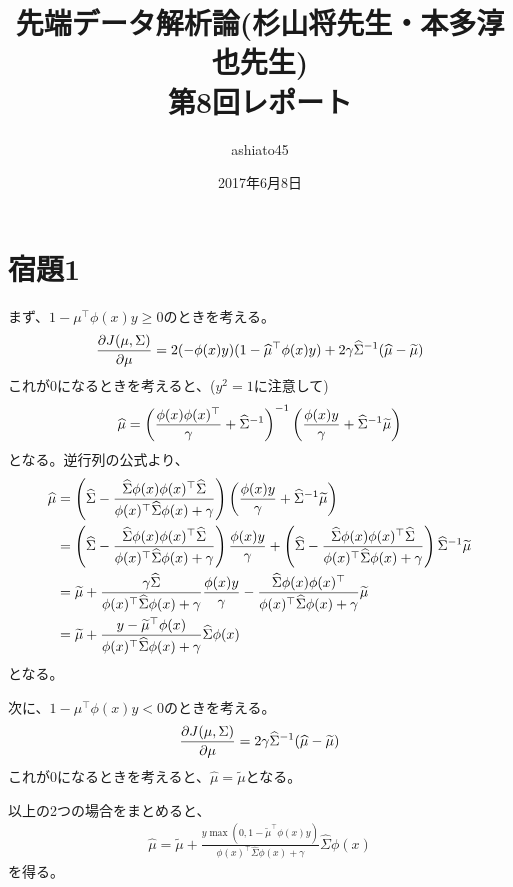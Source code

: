 \documentclass[9pt]{ltjsarticle}
\title{先端データ解析論(杉山将先生・本多淳也先生)\\第8回レポート}
\author{ashiato45}
\date{2017年6月8日}
\begin{document}
\maketitle

\section*{宿題1}
まず、$1-\mu^\top \phi(x)y \ge 0$のときを考える。
\begin{align}
\frac{\partial J(\mu, \Sigma)}{\partial \mu} = 
2(-\phi(x)y)(1-\widehat{\mu}^\top \phi(x)y) + 2\gamma \widehat\Sigma^{-1} (\widehat \mu - \widetilde \mu)
\end{align}
これが0になるときを考えると、($y^2=1$に注意して)
\begin{align}
\widehat \mu = \left(\frac{\phi(x)\phi(x)^\top}{\gamma} + \widehat \Sigma^{-1}\right)^{-1}\left(\frac{\phi(x)y}{\gamma} + \widehat\Sigma^{-1} \widetilde \mu\right)
\end{align}
となる。逆行列の公式より、
\begin{align}
\widehat \mu &= 
\left(\widehat\Sigma - \frac{\widehat\Sigma\phi(x)\phi(x)^\top \widehat\Sigma}{\phi(x)^\top \widehat\Sigma\phi(x)+\gamma}\right)
\left(\frac{\phi(x)y}{\gamma} + \widehat\Sigma^{-1} \widetilde \mu\right)\\
&=
\left(\widehat\Sigma - \frac{\widehat\Sigma\phi(x)\phi(x)^\top \widehat\Sigma}{\phi(x)^\top \widehat\Sigma\phi(x)+\gamma}\right)\frac{\phi(x)y}{\gamma}
+
\left(\widehat\Sigma - \frac{\widehat\Sigma\phi(x)\phi(x)^\top \widehat\Sigma}{\phi(x)^\top \widehat\Sigma\phi(x)+\gamma}\right)\widehat\Sigma^{-1} \widetilde\mu\\
&=
\widetilde\mu + \frac{\gamma\widehat\Sigma}{\phi(x)^\top \widehat\Sigma\phi(x)+\gamma}\frac{\phi(x)y}{\gamma} 
- \frac{\widehat\Sigma\phi(x)\phi(x)^\top}{\phi(x)^\top \widehat\Sigma\phi(x)+\gamma}\widetilde \mu\\
&=
\widetilde \mu + 
\frac{y-\widetilde\mu^\top\phi(x)}{\phi(x)^\top \widehat\Sigma\phi(x)+\gamma}\widehat\Sigma\phi(x)
\end{align}
となる。

次に、$1-\mu^\top \phi(x)y<0$のときを考える。
\begin{align}
\frac{\partial J(\mu, \Sigma)}{\partial \mu} = 
2\gamma \widehat\Sigma^{-1} (\widehat \mu - \widetilde \mu)
\end{align}
これが0になるときを考えると、$\hat\mu = \tilde \mu$となる。

以上の2つの場合をまとめると、
\begin{align}
\hat\mu = 
\tilde\mu + \frac{y\max(0, 1-\tilde\mu^\top \phi(x)y)}{\phi(x)^\top \hat\Sigma\phi(x)+\gamma}\hat\Sigma\phi(x)
\end{align}
を得る。
\end{document}
